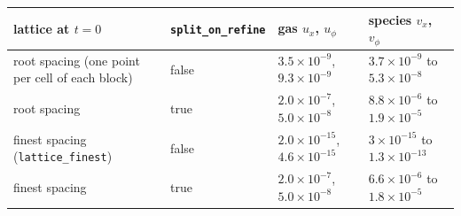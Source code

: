 \documentclass[11pt]{article}
\newcommand{\code}[1]{\texttt{#1}}
\begin{document}
\begin{center}
\begin{tabular}{@{}llll@{}}
\toprule
lattice at $t = 0$ & \code{split\_on\_refine} & gas $u_x$, $u_\phi$ & species $v_x$, $v_\phi$ \\
\midrule
root spacing (one point per cell of each block) & false & $3.5\times10^{-9}$, $9.3\times10^{-9}$ & $3.7\times10^{-9}$ to $5.3\times10^{-8}$ \\
root spacing & true & $2.0\times10^{-7}$, $5.0\times10^{-8}$ & $8.8\times10^{-6}$ to $1.9\times10^{-5}$ \\
finest spacing (\code{lattice\_finest}) & false & $2.0\times10^{-15}$, $4.6\times10^{-15}$ & $3\times10^{-15}$ to $1.3\times10^{-13}$ \\
finest spacing & true & $2.0\times10^{-7}$, $5.0\times10^{-8}$ & $6.6\times10^{-6}$ to $1.8\times10^{-5}$ \\
\bottomrule
\end{tabular}
\end{center}
\end{document}
